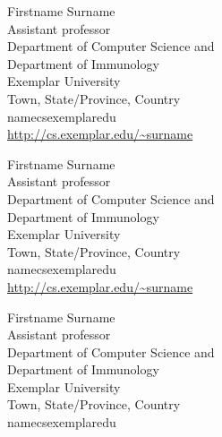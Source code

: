 

\appendix






\begin{tocauthors}
\begin{tocinfo}[vidick]
 Firstname Surname\\
 Assistant professor\\
 Department of Computer Science and\\
 Department of Immunology\\
 Exemplar University\\
 Town, State/Province, Country\\
 name\tocat{}cs\tocdot{}exemplar\tocdot{}edu \\   %
 \url{http://cs.exemplar.edu/~surname}      %
\end{tocinfo}
\begin{tocinfo}[grilo]
 Firstname Surname\\
 Assistant professor\\
 Department of Computer Science and\\
 Department of Immunology\\
 Exemplar University\\
 Town, State/Province, Country\\
 name\tocat{}cs\tocdot{}exemplar\tocdot{}edu \\   %
 \url{http://cs.exemplar.edu/~surname}      %
\end{tocinfo}
\begin{tocinfo}[jeffery]
 Firstname Surname\\
 Assistant professor\\
 Department of Computer Science and\\
 Department of Immunology\\
 Exemplar University\\
 Town, State/Province, Country\\
 name\tocat{}cs\tocdot{}exemplar\tocdot{}edu \\   %

\end{tocinfo}
\end{tocauthors}
